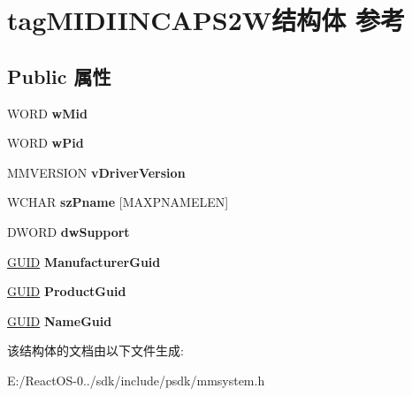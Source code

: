 \hypertarget{structtag_m_i_d_i_i_n_c_a_p_s2_w}{}\section{tag\+M\+I\+D\+I\+I\+N\+C\+A\+P\+S2\+W结构体 参考}
\label{structtag_m_i_d_i_i_n_c_a_p_s2_w}
\subsection*{Public 属性}
\begin{DoxyCompactItemize}
\item 
\mbox{\label{structtag_m_i_d_i_i_n_c_a_p_s2_w_a4376a5661f11f7e5bfa39cf6e05bb4ad}} 
W\+O\+RD {\bfseries w\+Mid}
\item 
\mbox{\label{structtag_m_i_d_i_i_n_c_a_p_s2_w_a1c6587f4b97d4d04221c167ec994a4a8}} 
W\+O\+RD {\bfseries w\+Pid}
\item 
\mbox{\label{structtag_m_i_d_i_i_n_c_a_p_s2_w_ac145dd13c942040bd3061c19f3c78f6e}} 
M\+M\+V\+E\+R\+S\+I\+ON {\bfseries v\+Driver\+Version}
\item 
\mbox{\label{structtag_m_i_d_i_i_n_c_a_p_s2_w_ad585d6e9b715ceef89f86bd68aa680ce}} 
W\+C\+H\+AR {\bfseries sz\+Pname} \mbox{[}M\+A\+X\+P\+N\+A\+M\+E\+L\+EN\mbox{]}
\item 
\mbox{\label{structtag_m_i_d_i_i_n_c_a_p_s2_w_a32f7ccfbb9d680f06ec810653f4cf24d}} 
D\+W\+O\+RD {\bfseries dw\+Support}
\item 
\mbox{\label{structtag_m_i_d_i_i_n_c_a_p_s2_w_a25a01cba346e9ee15daf54b8110efeaa}} 
\hyperlink{interface_g_u_i_d}{G\+U\+ID} {\bfseries Manufacturer\+Guid}
\item 
\mbox{\label{structtag_m_i_d_i_i_n_c_a_p_s2_w_a77bf2bde4344008926162b7dc0464e2d}} 
\hyperlink{interface_g_u_i_d}{G\+U\+ID} {\bfseries Product\+Guid}
\item 
\mbox{\label{structtag_m_i_d_i_i_n_c_a_p_s2_w_af722c4b30ace9bd60bf971993c32297b}} 
\hyperlink{interface_g_u_i_d}{G\+U\+ID} {\bfseries Name\+Guid}
\end{DoxyCompactItemize}


该结构体的文档由以下文件生成\+:\begin{DoxyCompactItemize}
\item 
E\+:/\+React\+O\+S-\/0../sdk/include/psdk/mmsystem.\+h\end{DoxyCompactItemize}
